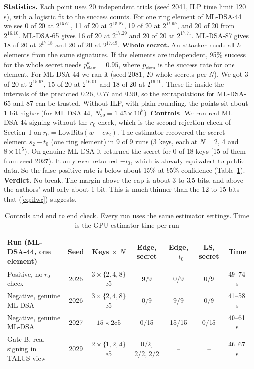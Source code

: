 \documentclass[10pt,conference,a4paper]{IEEEtran}
\newcommand{\LB}{\mathrm{LowBits}}
\begin{document}
\textbf{Statistics.} Each point uses 20 independent trials (seed 2041, ILP time limit 120\,s), with a logistic fit to the
success counts. For one ring element of ML-DSA-44 we see 0 of 20 at $2^{15.61}$, 11 of 20 at $2^{15.87}$, 19 of 20 at
$2^{15.99}$, and 20 of 20 from $2^{16.10}$. ML-DSA-65 gives 16 of 20 at $2^{17.29}$ and 20 of 20 at $2^{17.71}$. ML-DSA-87
gives 18 of 20 at $2^{17.18}$ and 20 of 20 at $2^{17.49}$. \textbf{Whole secret.} An attacker needs all $k$ elements from
the same signatures. If the elements are independent, 95\% success for the whole secret needs $p_\mathrm{elem}^k=0.95$,
where $p_\mathrm{elem}$ is the success rate for one element. For ML-DSA-44 we ran it (seed 2081, 20 whole secrets per $N$).
We got 3 of 20 at $2^{15.92}$, 15 of 20 at $2^{16.01}$ and 18 of 20 at $2^{16.10}$. These lie inside the intervals of the
predicted 0.26, 0.77 and 0.90, so the extrapolations for ML-DSA-65 and 87 can be trusted. Without ILP, with plain rounding,
the points sit about 1 bit higher (for ML-DSA-44, $N^*_{99}=1.45\times10^5$). \textbf{Controls.} We ran real ML-DSA-44
signing without the $r_0$ check, which is the second rejection check of Section~I on $r_0=\LB(w-cs_2)$. The estimator
recovered the secret element $s_2-t_0$ (one ring element) in 9 of 9 runs (3 keys, each at $N=2$, 4 and $8\times10^5$). On
genuine ML-DSA it returned the secret for 0 of 18 keys (15 of them from seed 2027). It only ever returned $-t_0$, which is
already equivalent to public data. So the false positive rate is below about 15\% at 95\% confidence
(Table~\ref{tab:controls}). \textbf{Verdict.} No break. The margin above the cap is about 3 to 3.5 bits, and above the
authors' wall only about 1 bit. This is much thinner than the 12 to 15 bits that (\ref{eq:ilwe}) suggests.

\begin{table}[t]
\caption{Controls and end to end check. Every run uses the same estimator settings. Time is the GPU estimator time per run}\label{tab:controls}
\centering\scriptsize
\begin{tabular}{@{}lcccccc@{}}
\toprule
Run (ML-DSA-44, one element) & Seed & Keys $\times$ $N$ & Edge, secret & Edge, $-t_0$ & LS, secret & Time\\
\midrule
Positive, no $r_0$ check & 2026 & $3\times\{2,4,8\}$e5 & 9/9 & 0/9 & 0/9 & 49--74\,s\\
Negative, genuine ML-DSA & 2026 & $3\times\{2,4,8\}$e5 & 0/9 & 9/9 & 0/9 & 41--58\,s\\
Negative, genuine ML-DSA & 2027 & $15\times2$e5 & 0/15 & 15/15 & 0/15 & 40--61\,s\\
Gate B, real signing in TALUS view & 2029 & $2\times\{1,2,4\}$e5 & 0/2, 2/2, 2/2 & -- & -- & 46--67\,s\\
\bottomrule
\end{tabular}
\end{table}
\end{document}
